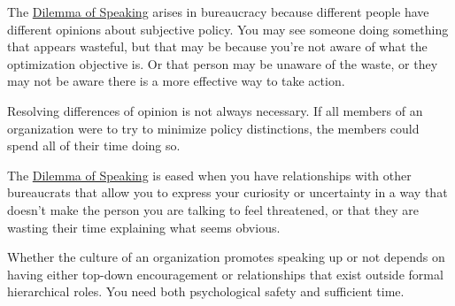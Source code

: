 The \hyperref[table:dilemma-personal-speak-up-or-hold-back]{Dilemma of Speaking} 
\iftoggle{printedonpaper}{ (\ref{table:dilemma-personal-speak-up-or-hold-back}) }{}%
arises in bureaucracy because different people have different opinions about subjective policy. You may see someone doing something that appears wasteful, but that may be because you're not aware of what the optimization objective is. Or that person may be unaware of the waste, or they may not be aware there is a more effective way to take action. 

Resolving differences of opinion is not always necessary. If all members of an organization were to try to minimize policy distinctions, the members could spend all of their time doing so. 

The \hyperref[table:dilemma-personal-speak-up-or-hold-back]{Dilemma of Speaking} is eased when you have relationships with other bureaucrats that allow you to express your curiosity or uncertainty in a way that doesn't make the person you are talking to feel threatened, or that they are wasting their time explaining what seems obvious. 

Whether the culture of an organization promotes speaking up or not depends on having either top-down encouragement or relationships that exist outside formal hierarchical roles. You need both psychological safety and sufficient time. 
  
